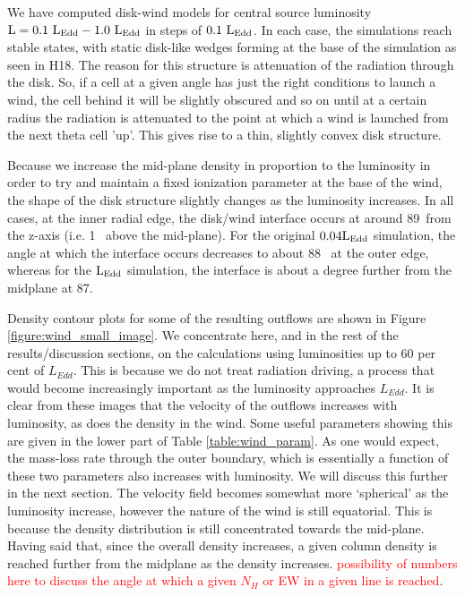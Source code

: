 \documentclass[a4paper,fleqn,usenatbib]{mnras}
\begin{document}
We have computed disk-wind models for central source luminosity 
$\rm{L=0.1~L_{Edd}-1.0~L_{Edd}}$ in steps of $\rm{0.1~L_{Edd}}$. In each case, the simulations reach stable states, 
with static disk-like wedges forming at the base of the simulation as seen in H18. The reason for this
structure is attenuation of the radiation through the disk. So, if a cell at a given angle has just the right
conditions to launch a wind, the cell behind it will be slightly obscured and so on until at a certain radius
the radiation is attenuated to the point at which a wind is launched from the next theta cell 'up'. This gives
rise to a thin, slightly convex disk structure. 

Because we increase the mid-plane density in proportion to the luminosity in order to try and maintain 
a fixed ionization parameter at the base of the wind, the shape of the disk structure slightly changes as
the luminosity increases. In all cases, at the inner radial edge, the disk/wind interface occurs at 
around 89\degree~from the z-axis (i.e. 1\degree~ above the mid-plane). For the original $\rm{0.04L_{Edd}}$ 
simulation, the angle at which the interface occurs decreases to about 88\degree~ at the outer edge, whereas for 
the $\rm{L_{Edd}}$ simulation, the interface is about a degree further from the
midplane at 87\degree.

Density contour plots for some of the resulting outflows are shown in Figure \ref{figure:wind_small_image}.
We concentrate here, and in the rest of the results/discussion sections, on the calculations using luminosities
up to 60 per cent of $L_{Edd}$. This is because we do not treat radiation driving, a process
that would become increasingly important as the luminosity approaches $L_{Edd}$.
It is clear from these images that the velocity of the outflows increases with luminosity, as does the 
density in the wind. Some useful parameters showing this are given in the lower part of Table \ref{table:wind_param}.
As one would expect, the mass-loss rate through the outer boundary, which is essentially a function of these 
two parameters also increases with luminosity. We will discuss this further in the next section. The velocity field 
becomes somewhat more `spherical' as the luminosity increase, however the nature of the wind is still equatorial.
This is because the density distribution is still concentrated towards the mid-plane. Having said that, since the overall
density increases, a given column density is reached further from the midplane as the density increases.
\textcolor{red}{possibility of numbers here to discuss the angle at which a given $N_H$ or EW 
in a given line is reached}.
\end{document}
